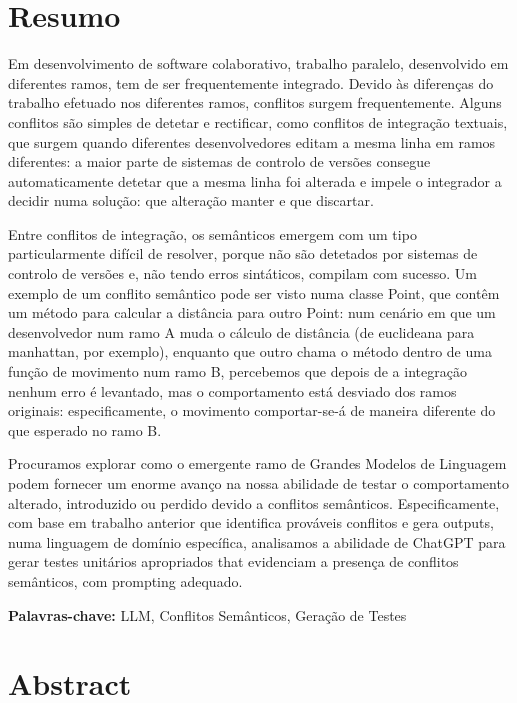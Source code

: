 \chapter*{Resumo}

Em desenvolvimento de software colaborativo, trabalho paralelo, desenvolvido em diferentes ramos, tem de ser frequentemente integrado. Devido às diferenças do trabalho efetuado nos diferentes ramos, conflitos surgem frequentemente. Alguns conflitos são simples de detetar e rectificar, como conflitos de integração textuais, que surgem quando diferentes desenvolvedores editam a mesma linha em ramos diferentes: a maior parte de sistemas de controlo de versões consegue automaticamente detetar que a mesma linha foi alterada e impele o integrador a decidir numa solução: que alteração manter e que discartar.

Entre conflitos de integração, os semânticos emergem com um tipo particularmente difícil de resolver, porque não são detetados por sistemas de controlo de versões e, não tendo erros sintáticos, compilam com sucesso. Um exemplo de um conflito semântico pode ser visto numa classe Point, que contêm um método para calcular a distância para outro Point: num cenário em que um desenvolvedor num ramo A muda o cálculo de distância (de euclideana para manhattan, por exemplo), enquanto que outro chama o método dentro de uma função de movimento num ramo B, percebemos que depois de a integração nenhum erro é levantado, mas o comportamento está desviado dos ramos originais: especificamente, o movimento comportar-se-á de maneira diferente do que esperado no ramo B.

Procuramos explorar como o emergente ramo de Grandes Modelos de Linguagem podem fornecer um enorme avanço na nossa abilidade de testar o comportamento alterado, introduzido ou perdido devido a conflitos semânticos.
Especificamente, com base em trabalho anterior que identifica prováveis conflitos e gera outputs, numa linguagem de domínio específica, analisamos a abilidade de ChatGPT para gerar testes unitários apropriados that evidenciam a presença de conflitos semânticos, com prompting adequado.

\bigskip\noindent
\textbf{Palavras-chave:} LLM, Conflitos Semânticos, Geração de Testes


\chapter*{Abstract}


